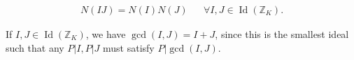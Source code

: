\begin{theorem}

\begin{align*}
N(IJ) = N(I) N(J) && \forall I, J \in \operatorname{Id}({\mathbb{Z}}_K)
.\end{align*}

\end{theorem}

\begin{remark}

If \(I, J\in \operatorname{Id}({\mathbb{Z}}_K)\), we have
\(\gcd(I, J) = I+J\), since this is the smallest ideal such that any
\(P\mathrel{\Big|}I, P\mathrel{\Big|}J\) must satisfy
\(P\mathrel{\Big|}\gcd(I, J)\).

\end{remark}


